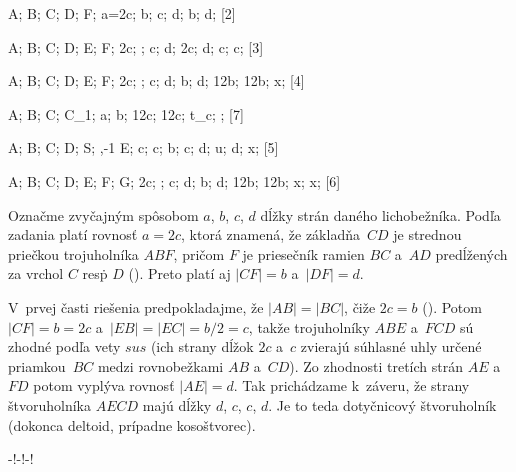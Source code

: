 {%
\fontplace
\tpoint A; \tpoint B; \lBpoint C; \rBpoint D;
\rpoint F;
\tpoint a=2c; \lBpoint b; \bpoint c; \rBpoint d;
\lBpoint b; \rBpoint d;
[2] \hfil\Obr

\fontplace
\tpoint A; \tpoint B; \lBpoint C; \rBpoint D;
\lBpoint E; \rpoint F;
\tpoint 2c; \point ; \tpoint c; \rBpoint d;
\lBpoint 2c; \rBpoint d;
\lBpoint c; \lBpoint c;
[3] \hfil\Obr

\fontplace
\tpoint A; \tpoint B; \lBpoint C; \rBpoint D;
\lBpoint E; \rpoint F;
\tpoint 2c; \point ; \bpoint c; \rBpoint d;
\lBpoint b; \rBpoint d;
\lBpoint \frac12b; \lBpoint \frac12b;
\tpoint x;
[4] \hfil\Obr

\fontplace
\tpoint A; \tpoint B; \bpoint C;
\tpoint C_1;
\lBpoint a; \rBpoint b;
\tpoint \frac12c; \tpoint \frac12c; \lBpoint t_c;
\cpoint\omega;
[7] \hfil\Obr

\fontplace
\tpoint A; \tpoint B; \lBpoint C; \rBpoint D;
\tpoint S;
\tpoint{},-1 E;
\tpoint c; \tpoint c; \point b; \bpoint c; \rBpoint d;
\rBpoint u; \rBpoint d; \tpoint x;
[5] \hfil\Obr

\fontplace
\tpoint A; \tpoint B; \blpoint C; \brpoint D;
\rBpoint E; \rpoint F; \tpoint G;
\tpoint 2c; \point ; \bpoint c; \rBpoint d;
\lBpoint b; \rBpoint d;
\lBpoint \frac12b; \lBpoint \frac12b;
\tpoint x; \tpoint x;
[6] \hfil\Obr

Označme zvyčajným spôsobom $a$, $b$, $c$, $d$ dĺžky
strán daného lichobežníka. Podľa zadania platí rovnosť $a=2c$,
ktorá znamená, že základňa~$CD$ je strednou priečkou trojuholníka $ABF$,
pričom $F$ je priesečník ramien $BC$ a~$AD$ predĺžených za vrchol
$C$ resp\. $D$ (\obr). Preto platí aj $|CF|=b$ a~$|DF|=d$.

V~prvej časti riešenia predpokladajme, že $|AB|=|BC|$, čiže $2c=b$
(\obr). Potom $|CF|=b=2c$ a~$|EB|=|EC|=b/2=c$, takže trojuholníky
$ABE$ a~$FCD$ sú zhodné podľa
vety $sus$ (ich strany dĺžok $2c$ a~$c$ zvierajú súhlasné
uhly určené priamkou~$BC$ medzi rovnobežkami $AB$ a~$CD$). Zo
zhodnosti tretích strán $AE$ a~$FD$ potom vyplýva rovnosť $|AE|=d$.
Tak prichádzame k~záveru, že strany štvoruholníka $AECD$ majú dĺžky
$d$, $c$, $c$, $d$. Je to teda dotyčnicový štvoruholník (dokonca
deltoid, prípadne kosoštvorec).

\midinsert
\centerline{\inspicture-!\hss\inspicture-!\hss\inspicture-!}
\endinsert

}
